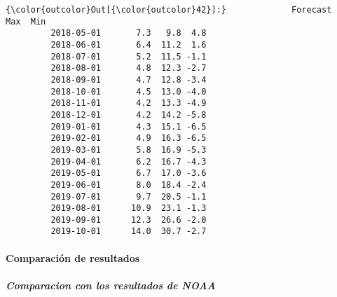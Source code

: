 \documentclass[11pt]{article}
\begin{document}
\begin{Verbatim}[commandchars=\\\{\}]
{\color{outcolor}Out[{\color{outcolor}42}]:}             Forecast   Max  Min
         2018-05-01       7.3   9.8  4.8
         2018-06-01       6.4  11.2  1.6
         2018-07-01       5.2  11.5 -1.1
         2018-08-01       4.8  12.3 -2.7
         2018-09-01       4.7  12.8 -3.4
         2018-10-01       4.5  13.0 -4.0
         2018-11-01       4.2  13.3 -4.9
         2018-12-01       4.2  14.2 -5.8
         2019-01-01       4.3  15.1 -6.5
         2019-02-01       4.9  16.3 -6.5
         2019-03-01       5.8  16.9 -5.3
         2019-04-01       6.2  16.7 -4.3
         2019-05-01       6.7  17.0 -3.6
         2019-06-01       8.0  18.4 -2.4
         2019-07-01       9.7  20.5 -1.1
         2019-08-01      10.9  23.1 -1.3
         2019-09-01      12.3  26.6 -2.0
         2019-10-01      14.0  30.7 -2.7
\end{Verbatim}
            
    \hypertarget{comparaciuxf3n-de-resultados}{%
\paragraph{Comparación de
resultados}\label{comparaciuxf3n-de-resultados}}

    \hypertarget{comparacion-con-los-resultados-de-noaa}{%
\subparagraph{\texorpdfstring{\textbf{Comparacion con los resultados de
NOAA}}{Comparacion con los resultados de NOAA}}\label{comparacion-con-los-resultados-de-noaa}}
\end{document}
